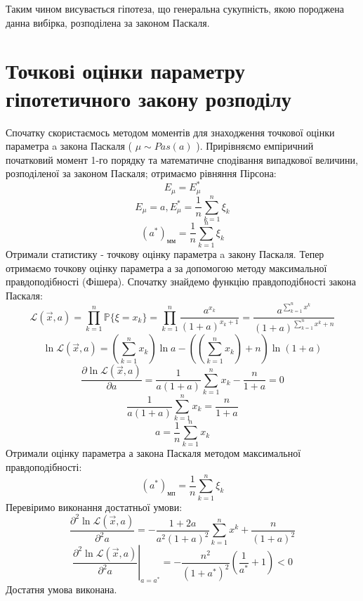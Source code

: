 \documentclass{article}
\begin{document}
\newline
Таким чином висувається гіпотеза, що генеральна сукупність, 
якою породжена данна вибірка, розподілена за законом Паскаля.
\newpage
\section{Точкові оцінки параметру гіпотетичного закону розподілу}
Спочатку скористаємось методом моментів для знаходження точкової 
оцінки параметра a закона Паскаля ( $\mu \sim Pas(a)$ ).
\newline
Прирівняємо емпіричний початковий момент 1-го порядку та математичне 
сподівання випадкової величини, розподіленої за законом Паскаля; 
отримаємо рівняння Пірсона: 
$$E_\mu = E^*_\mu$$
$$E_\mu = a, E^*_\mu = \frac{1}{n} \sum_{k = 1}^n \xi_k$$
\begin{equation}
  (a^*)_\text{мм} = \frac{1}{n} \sum_{k = 1}^n \xi_k
\end{equation}
Отримали статистику - точкову оцінку параметра a закону Паскаля.
\newline
Тепер отримаємо точкову оцінку параметра а за допомогою методу 
максимальної правдоподібності (Фішера). Спочатку знайдемо функцію 
правдоподібності закона Паскаля: 
$$\mathcal{L}( \vec{x}, a ) = \prod_{k = 1}^n \mathbb{P} 
\{\xi = x_k\} = \prod_{k = 1}^n \frac{a^{x_k}}{(1 + a)^{x_k + 1}} = 
\frac{a^{\sum_{k =1}^n x^k}}{(1 + a)^{\sum_{k =1}^n x^k + n}}$$
$$\ln \mathcal{L}( \vec{x}, a ) = (\sum_{k=1}^n x_k)\ln a - 
((\sum_{k=1}^n x_k) + n)\ln(1+a)$$
\begin{equation}
  \frac{\partial\ln \mathcal{L}( \vec{x}, a )}{\partial a} = 
  \frac{1}{a(1+a)}\sum_{k=1}^n x_k - \frac{n}{1+a} = 0
\end{equation}
$$\frac{1}{a(1+a)}\sum_{k=1}^n x_k = \frac{n}{1+a}$$
$$a = \frac{1}{n} \sum_{k=1}^n x_k$$
Отримали оцінку параметра а закона Паскаля методом 
максимальної правдоподібності:
\begin{equation}
  (a^*)_\text{мп} = \frac{1}{n}\sum_{k=1}^n \xi_k
\end{equation}
Перевіримо виконання достатньої умови:
$$\frac{\partial^2\ln \mathcal{L}( \vec{x}, a )}{\partial^2 a} = 
-\frac{1+2a}{a^2(1+a)^2}\sum_{k=1}^n x^k + \frac{n}{(1+a)^2}$$
\begin{equation}
  \left.{\frac{\partial^2\ln \mathcal{L}( \vec{x}, a )}{\partial^2 a}}
  \right|_{a = a^*} = -\frac{n^2}{(1+a^*)^2}({\frac{1}{a^*} + 1}) < 0
\end{equation}
Достатня умова виконана.
\newline
\end{document}
